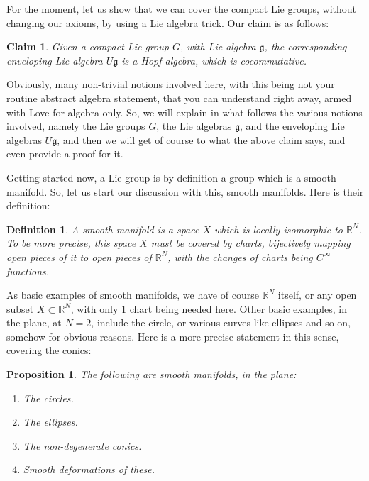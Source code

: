 \documentclass[12pt]{amsbook}
\newtheorem{claim}[theorem]{Claim}
\newtheorem{definition}[theorem]{Definition}
\newtheorem{proposition}[theorem]{Proposition}
\begin{document}
\bigskip

For the moment, let us show that we can cover the compact Lie groups, without changing our axioms, by using a Lie algebra trick. Our claim is as follows:

\begin{claim}
Given a compact Lie group $G$, with Lie algebra $\mathfrak g$, the corresponding enveloping Lie algebra $U\mathfrak g$ is a Hopf algebra, which is cocommutative.
\end{claim}

Obviously, many non-trivial notions involved here, with this being not your routine abstract algebra statement, that you can understand right away, armed with Love for algebra only. So, we will explain in what follows the various notions involved, namely the Lie groups $G$, the Lie algebras $\mathfrak g$, and the enveloping Lie algebras $U\mathfrak g$, and then we will get of course to what the above claim says, and even provide a proof for it.

\bigskip

Getting started now, a Lie group is by definition a group which is a smooth manifold. So, let us start our discussion with this, smooth manifolds. Here is their definition:

\begin{definition}
A smooth manifold is a space $X$ which is locally isomorphic to $\mathbb R^N$. To be more precise, this space $X$ must be covered by charts, bijectively mapping open pieces of it to open pieces of $\mathbb R^N$, with the changes of charts being $C^\infty$ functions.
\end{definition}

As basic examples of smooth manifolds, we have of course $\mathbb R^N$ itself, or any open subset $X\subset\mathbb R^N$, with only 1 chart being needed here. Other basic examples, in the plane, at $N=2$, include the circle, or various curves like ellipses and so on, somehow for obvious reasons. Here is a more precise statement in this sense, covering the conics:


\begin{proposition}
The following are smooth manifolds, in the plane:
\begin{enumerate}
\item The circles.

\item The ellipses.

\item The non-degenerate conics.

\item Smooth deformations of these.
\end{enumerate}
\end{proposition}
\end{document}

